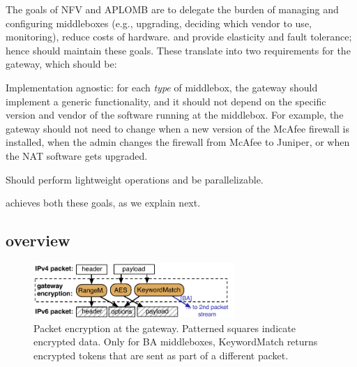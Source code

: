 The goals of NFV and APLOMB are to delegate the burden of managing and configuring
middleboxes (e.g., upgrading, deciding which vendor to use, monitoring), reduce costs of hardware. 
and provide elasticity and fault tolerance; hence \sys should maintain these goals.
%
These translate into two  requirements for the gateway, which should be: 
\begin{CompactItemize}
\item Implementation agnostic: for each {\em type} of middlebox, the gateway should implement a generic functionality, and it should not depend on the specific version and vendor of the software running at the middlebox. For example, the gateway should not need to change when a new version of the McAfee firewall is installed, when the admin changes the firewall  from McAfee to Juniper, or when the NAT software gets upgraded. 
\item Should perform lightweight operations and be parallelizable. 

\end{CompactItemize}


\sys achieves both these goals, as we explain next.


\subsection{\sys overview}


\begin{figure}[t!]
\centering
  \includegraphics[width=3.0in]{fig/packet.pdf}
\caption{Packet encryption at the gateway. Patterned squares indicate encrypted data. Only for BA  middleboxes,  KeywordMatch returns encrypted tokens that are sent 
as part of a different packet. \label{fig:packet}}
\end{figure}





